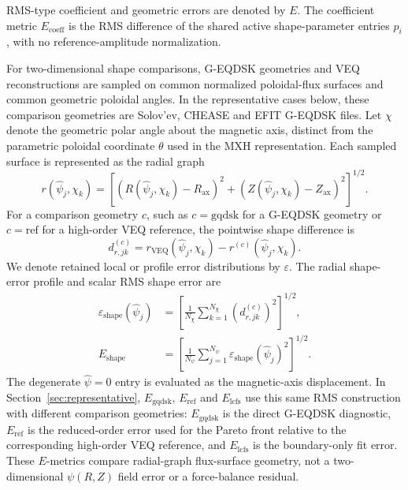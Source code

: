 \documentclass[final, 3p, times]{elsarticle}
\begin{document}
RMS-type coefficient and geometric errors are denoted by $E$. The coefficient metric $E_{\mathrm{coeff}}$ is the RMS difference of the shared active shape-parameter entries $p_i$, with no reference-amplitude normalization.

For two-dimensional shape comparisons, G-EQDSK geometries and VEQ reconstructions are sampled on common normalized poloidal-flux surfaces and common geometric poloidal angles. In the representative cases below, these comparison geometries are Solov'ev, CHEASE and EFIT G-EQDSK files. Let $\chi$ denote the geometric polar angle about the magnetic axis, distinct from the parametric poloidal coordinate $\theta$ used in the MXH representation. Each sampled surface is represented as the radial graph
\begin{equation}
    r(\hat{\psi}_j,\chi_k)
    =\left[(R(\hat{\psi}_j,\chi_k)-R_{\mathrm{ax}})^2
    +(Z(\hat{\psi}_j,\chi_k)-Z_{\mathrm{ax}})^2\right]^{1/2}.
\end{equation}
For a comparison geometry $c$, such as $c=\mathrm{gqdsk}$ for a G-EQDSK geometry or $c=\mathrm{ref}$ for a high-order VEQ reference, the pointwise shape difference is
\begin{equation}
    d_{r,jk}^{(c)}
    =r_{\mathrm{VEQ}}(\hat{\psi}_j,\chi_k)-r^{(c)}(\hat{\psi}_j,\chi_k).
\end{equation}
We denote retained local or profile error distributions by $\varepsilon$. The radial shape-error profile and scalar RMS shape error are
\begin{align}
    \varepsilon_{\mathrm{shape}}(\hat{\psi}_j)
     & =\left[\frac{1}{N_\chi}\sum_{k=1}^{N_\chi}\left(d_{r,jk}^{(c)}\right)^2\right]^{1/2},                \\
    E_{\mathrm{shape}}
     & =\left[\frac{1}{N_\psi}\sum_{j=1}^{N_\psi}\varepsilon_{\mathrm{shape}}(\hat{\psi}_j)^2\right]^{1/2}.
\end{align}
The degenerate $\hat{\psi}=0$ entry is evaluated as the magnetic-axis displacement. In Section~\ref{sec:representative}, $E_{\mathrm{gqdsk}}$, $E_{\mathrm{ref}}$ and $E_{\mathrm{lcfs}}$ use this same RMS construction with different comparison geometries: $E_{\mathrm{gqdsk}}$ is the direct G-EQDSK diagnostic, $E_{\mathrm{ref}}$ is the reduced-order error used for the Pareto front relative to the corresponding high-order VEQ reference, and $E_{\mathrm{lcfs}}$ is the boundary-only fit error. These $E$-metrics compare radial-graph flux-surface geometry, not a two-dimensional $\psi(R,Z)$ field error or a force-balance residual.
\end{document}
